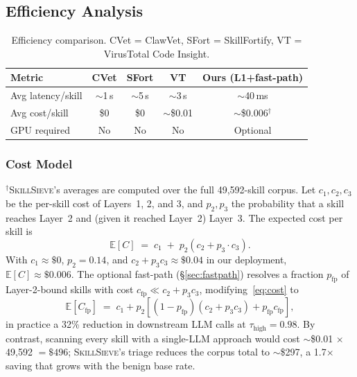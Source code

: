 \documentclass[sigconf,nonacm]{acmart}
\begin{document}
\subsection{Efficiency Analysis}

\begin{table}[!htbp]
\centering
\caption{Efficiency comparison. CVet = ClawVet, SFort = SkillFortify, VT = VirusTotal Code Insight.}
\label{tab:efficiency}
\begin{tabular}{lcccc}
\toprule
\textbf{Metric} & \textbf{CVet} & \textbf{SFort} & \textbf{VT} & \textbf{Ours (L1+fast-path)} \\
\midrule
Avg latency/skill & $\sim$1\,s & $\sim$5\,s & $\sim$3\,s & $\sim$40\,ms \\
Avg cost/skill & \$0 & \$0 & $\sim$\$0.01 & $\sim$\$0.006$^\dagger$ \\
GPU required & No & No & No & Optional \\
\bottomrule
\end{tabular}
\end{table}

\subsubsection{Cost Model}
$^\dagger$\textsc{SkillSieve}'s averages are computed over the full 49,592-skill corpus. Let $c_1, c_2, c_3$ be the per-skill cost of Layers~1, 2, and 3, and $p_2, p_3$ the probability that a skill reaches Layer~2 and (given it reached Layer~2) Layer~3. The expected cost per skill is
\begin{equation}
\label{eq:cost}
\mathbb{E}[C] \;=\; c_1 \;+\; p_2\!\left(c_2 + p_3 \cdot c_3\right).
\end{equation}
With $c_1 \approx \$0$, $p_2 = 0.14$, and $c_2 + p_3 c_3 \approx \$0.04$ in our deployment, $\mathbb{E}[C] \approx \$0.006$. The optional fast-path (\S\ref{sec:fastpath}) resolves a fraction $p_{\text{fp}}$ of Layer-2-bound skills with cost $c_{\text{fp}} \ll c_2 + p_3 c_3$, modifying~\eqref{eq:cost} to
\begin{equation}
\mathbb{E}[C_{\text{fp}}] \;=\; c_1 + p_2\!\left[(1{-}p_{\text{fp}})(c_2 + p_3 c_3) + p_{\text{fp}} c_{\text{fp}}\right],
\end{equation}
in practice a 32\% reduction in downstream LLM calls at $\tau_{\text{high}} = 0.98$. By contrast, scanning every skill with a single-LLM approach would cost $\sim$\$0.01 $\times$ 49{,}592 $= \$496$; \textsc{SkillSieve}'s triage reduces the corpus total to $\sim$\$297, a 1.7$\times$ saving that grows with the benign base rate.
\end{document}
